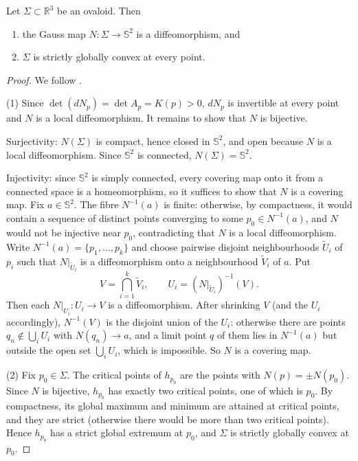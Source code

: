 \begin{theorem}[Hadamard]
\label{theorem-alias-hadamard}
Let $\Sigma\subset\mathbb{R}^3$ be an
ovaloid. Then
\begin{enumerate}
\item the Gauss map
$N:\Sigma\to\mathbb{S}^2$ is a
diffeomorphism, and
\item $\Sigma$ is strictly globally convex
at every point.
\end{enumerate}
\end{theorem}

\begin{proof}
We follow \cite[Theorem 2.6,
pp.~19--20]{alias2006analisis}.

(1) Since $\det(dN_p)=\det A_p=K(p)>0$,
$dN_p$ is invertible at every point and
$N$ is a local diffeomorphism. It remains
to show that $N$ is bijective.

Surjectivity: $N(\Sigma)$ is compact,
hence closed in $\mathbb{S}^2$, and open
because $N$ is a local diffeomorphism.
Since $\mathbb{S}^2$ is connected,
$N(\Sigma)=\mathbb{S}^2$.

Injectivity: since $\mathbb{S}^2$ is
simply connected, every covering map
onto it from a connected space is a
homeomorphism, so it suffices to show
that $N$ is a covering map. Fix
$a\in\mathbb{S}^2$. The fibre $N^{-1}(a)$
is finite: otherwise, by compactness, it
would contain a sequence of distinct
points converging to some $p_0\in
N^{-1}(a)$, and $N$ would not be injective
near $p_0$, contradicting that $N$ is a
local diffeomorphism. Write
$N^{-1}(a)=\{p_1,\dots,p_k\}$ and choose
pairwise disjoint neighbourhoods
$\tilde{U}_i$ of $p_i$ such that
$N|_{\tilde{U}_i}$ is a diffeomorphism
onto a neighbourhood $\tilde{V}_i$ of
$a$. Put
$$
V=\bigcap_{i=1}^k\tilde{V}_i,
\qquad
U_i=(N|_{\tilde{U}_i})^{-1}(V).
$$
Then each $N|_{U_i}:U_i\to V$ is a
diffeomorphism. After shrinking $V$ (and
the $U_i$ accordingly), $N^{-1}(V)$ is the
disjoint union of the $U_i$: otherwise
there are
points $q_n\notin\bigcup_iU_i$ with
$N(q_n)\to a$, and a limit point $q$ of
them lies in $N^{-1}(a)$ but outside the
open set $\bigcup_iU_i$, which is
impossible. So $N$ is a covering map.

(2) Fix $p_0\in\Sigma$. The critical
points of $h_{p_0}$ are the points with
$N(p)=\pm N(p_0)$. Since $N$ is
bijective, $h_{p_0}$ has exactly two
critical points, one of which is $p_0$.
By compactness, its global maximum and
minimum are attained at critical points,
and they are strict (otherwise there would
be more than two critical points). Hence
$h_{p_0}$ has a strict global extremum at
$p_0$, and $\Sigma$ is strictly globally
convex at $p_0$.
\end{proof}

